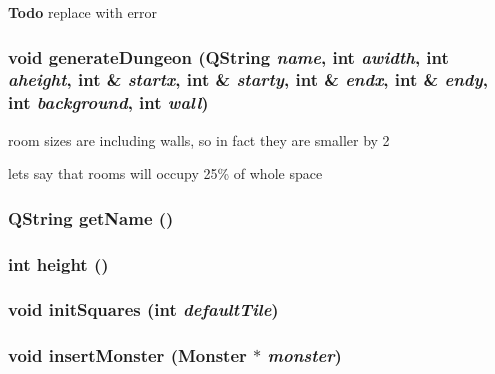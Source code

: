 \begin{Desc}
\item[{\bf Todo}]replace with error\end{Desc}
\subsubsection{\setlength{\rightskip}{0pt plus 5cm}void generate\-Dungeon (QString {\em name}, int {\em awidth}, int {\em aheight}, int \& {\em startx}, int \& {\em starty}, int \& {\em endx}, int \& {\em endy}, int {\em background}, int {\em wall})}\label{classGameMap_a17}


room sizes are including walls, so in fact they are smaller by 2

lets say that rooms will occupy 25\% of whole space 
\subsubsection{\setlength{\rightskip}{0pt plus 5cm}QString get\-Name ()}\label{classGameMap_a11}


\subsubsection{\setlength{\rightskip}{0pt plus 5cm}int height ()}\label{classGameMap_a6}


\subsubsection{\setlength{\rightskip}{0pt plus 5cm}void init\-Squares (int {\em default\-Tile})\hspace{0.3cm}{\tt  [protected]}}\label{classGameMap_b1}


\subsubsection{\setlength{\rightskip}{0pt plus 5cm}void insert\-Monster ({\bf Monster} $\ast$ {\em monster})}\label{classGameMap_a0}


